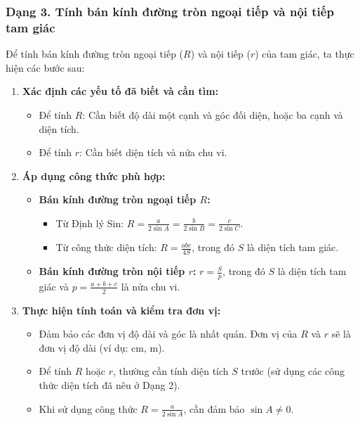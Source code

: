 \subsubsection{Dạng 3. Tính bán kính đường tròn ngoại tiếp và nội tiếp tam giác}
\begin{phuongphap}
Để tính bán kính đường tròn ngoại tiếp ($R$) và nội tiếp ($r$) của tam giác, ta thực hiện các bước sau:
\begin{enumerate}
    \item \textbf{Xác định các yếu tố đã biết và cần tìm:}
    \begin{itemize}
        \item Để tính $R$: Cần biết độ dài một cạnh và góc đối diện, hoặc ba cạnh và diện tích.
        \item Để tính $r$: Cần biết diện tích và nửa chu vi.
    \end{itemize}
    \item \textbf{Áp dụng công thức phù hợp:}
    \begin{itemize}
        \item \textbf{Bán kính đường tròn ngoại tiếp $R$:}
        \begin{itemize}
            \item Từ Định lý Sin: $R = \frac{a}{2\sin A} = \frac{b}{2\sin B} = \frac{c}{2\sin C}$.
            \item Từ công thức diện tích: $R = \frac{abc}{4S}$, trong đó $S$ là diện tích tam giác.
        \end{itemize}
        \item \textbf{Bán kính đường tròn nội tiếp $r$:}
        $r = \frac{S}{p}$, trong đó $S$ là diện tích tam giác và $p = \frac{a+b+c}{2}$ là nửa chu vi.
    \end{itemize}
    \item \textbf{Thực hiện tính toán và kiểm tra đơn vị:}
    \begin{itemize}
        \item Đảm bảo các đơn vị độ dài và góc là nhất quán. Đơn vị của $R$ và $r$ sẽ là đơn vị độ dài (ví dụ: cm, m).
        \item Để tính $R$ hoặc $r$, thường cần tính diện tích $S$ trước (sử dụng các công thức diện tích đã nêu ở Dạng 2).
        \item Khi sử dụng công thức $R = \frac{a}{2\sin A}$, cần đảm bảo $\sin A \neq 0$.
    \end{itemize}
\end{enumerate}
\end{phuongphap}
